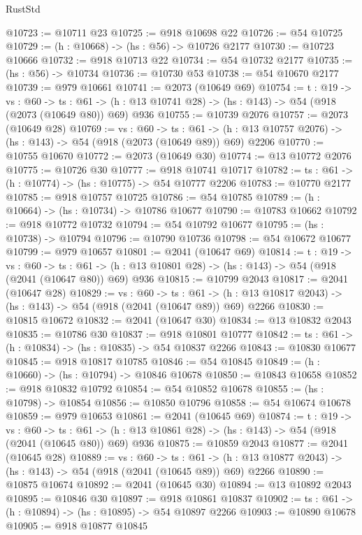 \begin{lexlean}{RustStd}
\begin{coremodule}
@10723 := @10711 @23
@10725 := @918 @10698 @22
@10726 := @54 @10725
@10729 := (h : @10668) -> (hs : @56) -> @10726 @2177
@10730 := @10723 @10666
@10732 := @918 @10713 @22
@10734 := @54 @10732 @2177
@10735 := (hs : @56) -> @10734
@10736 := @10730 @53
@10738 := @54 @10670 @2177
@10739 := @979 @10661
@10741 := @2073 (@10649 @69)
@10754 := {t : @19} ->
  {vs : @60} ->
  {ts : @61} -> (h : @13 @10741 @28) -> (hs : @143) -> @54 (@918 (@2073 (@10649 @80)) @69) @936
@10755 := @10739 @2076
@10757 := @2073 (@10649 @28)
@10769 := {vs : @60} ->
  {ts : @61} -> (h : @13 @10757 @2076) -> (hs : @143) -> @54 (@918 (@2073 (@10649 @89)) @69) @2206
@10770 := @10755 @10670
@10772 := @2073 (@10649 @30)
@10774 := @13 @10772 @2076
@10775 := @10726 @30
@10777 := @918 @10741 @10717
@10782 := {ts : @61} -> (h : @10774) -> (hs : @10775) -> @54 @10777 @2206
@10783 := @10770 @2177
@10785 := @918 @10757 @10725
@10786 := @54 @10785
@10789 := (h : @10664) -> (hs : @10734) -> @10786 @10677
@10790 := @10783 @10662
@10792 := @918 @10772 @10732
@10794 := @54 @10792 @10677
@10795 := (hs : @10738) -> @10794
@10796 := @10790 @10736
@10798 := @54 @10672 @10677
@10799 := @979 @10657
@10801 := @2041 (@10647 @69)
@10814 := {t : @19} ->
  {vs : @60} ->
  {ts : @61} -> (h : @13 @10801 @28) -> (hs : @143) -> @54 (@918 (@2041 (@10647 @80)) @69) @936
@10815 := @10799 @2043
@10817 := @2041 (@10647 @28)
@10829 := {vs : @60} ->
  {ts : @61} -> (h : @13 @10817 @2043) -> (hs : @143) -> @54 (@918 (@2041 (@10647 @89)) @69) @2266
@10830 := @10815 @10672
@10832 := @2041 (@10647 @30)
@10834 := @13 @10832 @2043
@10835 := @10786 @30
@10837 := @918 @10801 @10777
@10842 := {ts : @61} -> (h : @10834) -> (hs : @10835) -> @54 @10837 @2266
@10843 := @10830 @10677
@10845 := @918 @10817 @10785
@10846 := @54 @10845
@10849 := (h : @10660) -> (hs : @10794) -> @10846 @10678
@10850 := @10843 @10658
@10852 := @918 @10832 @10792
@10854 := @54 @10852 @10678
@10855 := (hs : @10798) -> @10854
@10856 := @10850 @10796
@10858 := @54 @10674 @10678
@10859 := @979 @10653
@10861 := @2041 (@10645 @69)
@10874 := {t : @19} ->
  {vs : @60} ->
  {ts : @61} -> (h : @13 @10861 @28) -> (hs : @143) -> @54 (@918 (@2041 (@10645 @80)) @69) @936
@10875 := @10859 @2043
@10877 := @2041 (@10645 @28)
@10889 := {vs : @60} ->
  {ts : @61} -> (h : @13 @10877 @2043) -> (hs : @143) -> @54 (@918 (@2041 (@10645 @89)) @69) @2266
@10890 := @10875 @10674
@10892 := @2041 (@10645 @30)
@10894 := @13 @10892 @2043
@10895 := @10846 @30
@10897 := @918 @10861 @10837
@10902 := {ts : @61} -> (h : @10894) -> (hs : @10895) -> @54 @10897 @2266
@10903 := @10890 @10678
@10905 := @918 @10877 @10845

\end{coremodule}
\end{lexlean}
